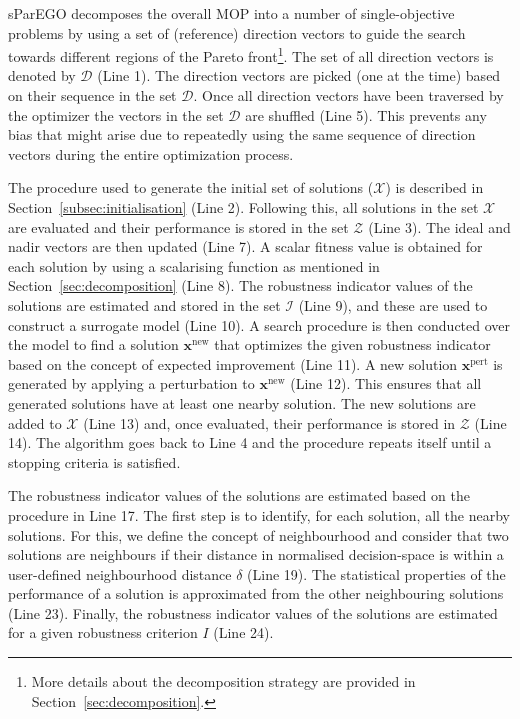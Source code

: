 \documentclass{llncs}
\newcommand{\vx}{\mathbf{x}} %
\newcommand{\DSet}{\mathcal{D}} %
\newcommand{\XSet}{\mathcal{X}} %
\newcommand{\ZSet}{\mathcal{Z}} %
\newcommand{\ISet}{\mathcal{I}} %
\begin{document}
sParEGO decomposes the overall MOP into a number of single-objective problems by using a set of (reference) direction vectors to guide the search towards different regions of the Pareto front\footnote{More details about the decomposition strategy are provided in Section~\ref{sec:decomposition}.}. The set of all direction vectors is denoted by $\DSet$ (Line 1). The direction vectors are picked (one at the time) based on their sequence in the set $\DSet$. Once all direction vectors have been traversed by the optimizer the vectors in the set $\DSet$ are shuffled (Line 5). This prevents any bias that might arise due to repeatedly using the same sequence of direction vectors during the entire optimization process. 

The procedure used to generate the initial set of solutions ($\XSet$) is described in Section~\ref{subsec:initialisation} (Line 2). Following this, all solutions in the set $\XSet$ are evaluated and their performance is stored in the set $\ZSet$ (Line 3). The ideal and nadir vectors are then updated (Line 7). A scalar fitness value is obtained for each solution by using a scalarising function as mentioned in Section~\ref{sec:decomposition} (Line 8). The robustness indicator values of the solutions are estimated and stored in the set $\ISet$ (Line 9), and these are used to construct a surrogate model (Line 10). A search procedure is then conducted over the model to find a solution $\vx^\text{new}$ that optimizes the given robustness indicator based on the concept of expected improvement (Line 11). A new solution $\vx^\text{pert}$ is generated by applying a perturbation to $\vx^\text{new}$ (Line 12). This ensures that all generated solutions have at least one nearby solution. The new solutions are added to $\XSet$ (Line 13) and, once evaluated, their performance is stored in $\ZSet$ (Line 14). The algorithm goes back to Line 4 and the procedure repeats itself until a stopping criteria is satisfied.

The robustness indicator values of the solutions are estimated based on the procedure in Line 17. The first step is to identify, for each solution, all the nearby solutions. For this, we define the concept of neighbourhood and consider that two solutions are neighbours if their distance in normalised decision-space is within a user-defined neighbourhood distance $\delta$ (Line 19). The statistical properties of the performance of a solution is approximated from the other neighbouring solutions (Line 23). Finally, the robustness indicator values of the solutions are estimated for a given robustness criterion $I$ (Line 24).
\end{document}
